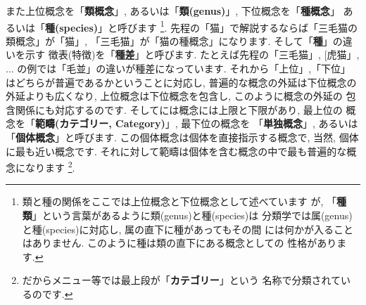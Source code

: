 \documentclass[b5j,8pt,twocolumn]{ltjsarticle}
\begin{document}
また上位概念を「\textbf{類概念}」, あるいは「\textbf{類(genus)}」,
 下位概念を「\textbf{種概念}」 あるいは「\textbf{種(species)}」と呼びます
\footnote{類と種の関係をここでは上位概念と下位概念として述べています
が, 「\textbf{種類}」という言葉があるように類(genus)と種(species)は
分類学では属(genus)と種(species)に対応し, 属の直下に種があってもその間
には何かが入ることはありません. このように種は類の直下にある概念としての
性格があります.}. 先程の「猫」で解説するならば「三毛猫の類概念」が「猫」,
「三毛猫」が「猫の種概念」になります. そして「\textbf{種}」の違いを示す
徴表(特徴)を「\textbf{種差}」と呼びます. たとえば先程の「三毛猫」, [虎猫」,
... の例では「毛並」の違いが種差になっています. それから「上位」,「下位」
はどちらが普遍であるかということに対応し, 普遍的な概念の外延は下位概念の
外延よりも広くなり, 上位概念は下位概念を包含し, このように概念の外延の
包含関係にも対応するのです. そしてには概念には上限と下限があり, 最上位の
概念を「\textbf{範疇(カテゴリー, Category)}」, 最下位の概念を
「\textbf{単独概念}」, あるいは「\textbf{個体概念}」と呼びます.
 この個体概念は個体を直接指示する概念で, 当然, 個体に最も近い概念です.
 それに対して範疇は個体を含む概念の中で最も普遍的な概念になります
\footnote{だからメニュー等では最上段が「\textbf{カテゴリー}」という
名称で分類されているのです.}.
\newline
\end{document}
